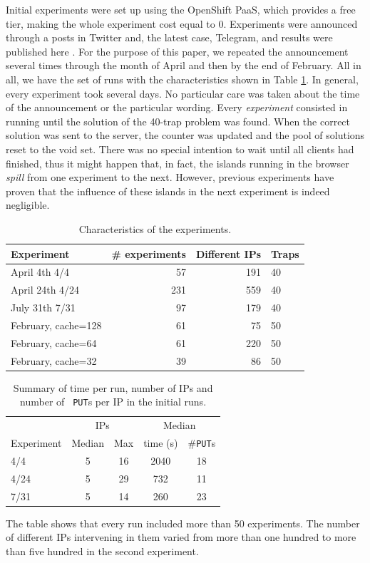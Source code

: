 \documentclass[letterpaper]{article}
\begin{document}
Initial experiments were set up using the OpenShift
PaaS, which provides a free tier, making the whole experiment cost
equal to 0. Experiments were
announced through a posts in Twitter and, the latest case, Telegram, and
results were published here \citep{DBLP:conf/gecco/GuervosG15}. For the
purpose of this paper, we repeated the announcement several times
through the month of April and then by the end of February. All
in all, we have the set of runs with the characteristics shown in
Table \ref{tab:runs}. In general, every experiment took several
days. No particular care was taken about the time of the announcement
or the particular wording. Every {\em experiment} consisted in running
until the solution of the 40-trap problem was found. When the correct
solution was sent to the server, the counter was updated and the pool
of solutions reset to the void set. There was no special intention to wait
until all clients had finished, thus it might happen that, in fact,
the islands running in the browser {\em spill} from one experiment to
the next. However, previous experiments have proven that the influence
of these islands in the next experiment is indeed negligible.
%
\begin{table}
\caption{Characteristics of the experiments. \label{tab:runs}}
\begin{center}
\begin{tabular}{l|rrl}
\hline
Experiment & \# experiments & Different IPs & Traps \\
\hline
April 4th 4/4 & 57 & 191 & 40 \\
April 24th 4/24 &  231 & 559& 40  \\
July 31th 7/31 & 97 & 179 & 40 \\
February, cache=128 & 61 & 75 & 50  \\
February, cache=64 & 61 & 220 & 50  \\
February, cache=32 & 39 & 86 & 50  \\
\hline
\end{tabular}
\end{center}
\end{table}
%
\begin{table}
\caption{Summary of time per run, number of IPs and number of {\tt
    PUT}s per IP in the initial runs. \label{tab:summary:os}}
\begin{center}
\begin{tabular}{l|cccc}
\hline
     & \multicolumn{2}{c}{IPs} & \multicolumn{2}{c}{Median} \\
Experiment & Median & Max & time (s) &  \#{\tt  PUT}s \\
\hline
4/4 & 5 & 16 & 2040 & 18   \\
4/24 &  5 & 29 & 732 & 11  \\
7/31 & 5 & 14 & 260 & 23   \\
\hline
\end{tabular}
\end{center}
\end{table}
%
The table shows that every run included more than 50 experiments. The
number of different IPs intervening in them varied from more than one
hundred to more than five hundred in the second experiment.
\end{document}
